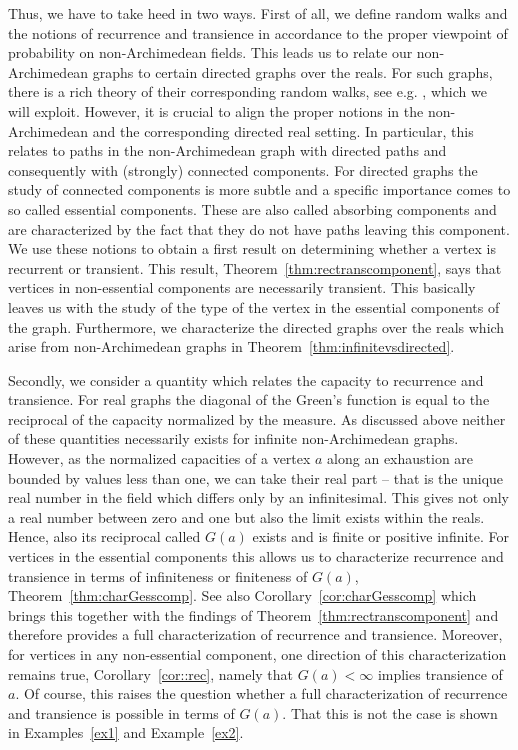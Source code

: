 \documentclass[a4paper,oneside, 12pt]{amsart}
\numberwithin{theorem}{section}
\theoremstyle{definition}
\newcommand{\G}{{G}}
\begin{document}
{Thus, we have to take heed in two ways. First of all, we define random walks and the notions of recurrence and transience in accordance to the proper viewpoint of probability on non-Archimedean fields. This leads us to relate our non-Archimedean graphs to certain directed graphs over the reals. For such graphs, there is a rich theory of their corresponding random walks, see e.g. \cite{Woess09}, which we will exploit. However, it is crucial to align the proper notions in the non-Archimedean and the corresponding directed real setting. In particular, this relates to paths in the non-Archimedean graph with  directed paths and consequently with (strongly) connected components.  For directed graphs the study of connected components is more subtle and a specific importance comes to so called essential components. These are also called absorbing components and are characterized by the fact that they do not have paths leaving this component.
We use these notions to obtain a first result on determining whether a vertex is recurrent or transient. This result, Theorem~\ref{thm:rectranscomponent}, says that vertices in non-essential components  are necessarily transient. This basically leaves us with the study of the type of the vertex in the essential components of the graph. Furthermore,  we characterize the directed graphs over the reals which arise from non-Archimedean graphs in Theorem~\ref{thm:infinitevsdirected}.

Secondly, we consider a quantity which relates the capacity to recurrence and transience. For real graphs the diagonal of the Green's function is equal to the reciprocal of the capacity normalized by the measure. As discussed above neither of these quantities necessarily exists for infinite non-Archimedean graphs. However, as the normalized capacities  of a vertex $ a $ along an exhaustion are bounded by values less than one, we can take their real part -- that is the unique real number in the field which differs only by an infinitesimal. This gives not only a real number between zero and one but  also  the limit exists within the reals. Hence, also its reciprocal called $ \G(a) $ exists and is finite or positive infinite. For vertices in the essential components this allows us to characterize recurrence and transience in terms of infiniteness or finiteness of $ \G(a) $,  Theorem~\ref{thm:charGesscomp}. See also Corollary~\ref{cor:charGesscomp} which brings this together with the findings of Theorem~\ref{thm:rectranscomponent} and therefore provides a full characterization of recurrence and transience. Moreover, for vertices in any non-essential component,  one direction of this characterization remains true, Corollary~\ref{cor::rec}, namely that $ \G(a) <\infty$ implies transience of $ a $. Of course, this raises the question whether a full characterization of recurrence and transience is possible in terms of $ \G(a) $. That this is not the case  is shown in Examples~\ref{ex1} and Example~\ref{ex2}.

}
\end{document}
